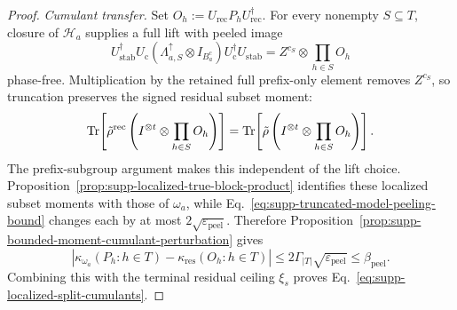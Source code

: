 \documentclass[
  aps,
  prx,
  reprint,
  superscriptaddress,
  amsmath,
  amssymb,
  nofootinbib,
  longbibliography
]{revtex4-2}
\begin{document}
\begin{proof}
\emph{Cumulant transfer.}
Set $O_h:=U_{\mathrm{rec}}P_hU_{\mathrm{rec}}^\dagger$.  For every
nonempty $S\subseteq T$, closure of $\mathcal H_a$ supplies a full lift
with peeled image
\begin{equation}
U_{\mathrm{stab}}^\dagger
U_{\mathrm c}
\left(\Lambda_{a,S}^\uparrow\otimes I_{B_a^c}\right)
U_{\mathrm c}^\dagger
U_{\mathrm{stab}}
=
Z^{c_S}\otimes\prod_{h\in S}O_h
\end{equation}
phase-free.  Multiplication by the retained full prefix-only element removes
$Z^{c_S}$, so truncation preserves the signed residual subset moment:
\begin{equation}
\Tr\!\left[
\tilde\rho^{\mathrm{rec}}
\left(I^{\otimes t}\otimes\prod_{h\in S}O_h\right)
\right]
=
\Tr\!\left[
\tilde\rho
\left(I^{\otimes t}\otimes\prod_{h\in S}O_h\right)
\right].
\label{eq:supp-tested-moment-truncation-preservation}
\end{equation}
The prefix-subgroup argument makes this independent of the lift choice.
Proposition~\ref{prop:supp-localized-true-block-product} identifies these
localized subset moments with those of $\omega_a$, while
Eq.~\eqref{eq:supp-truncated-model-peeling-bound} changes each by at most
$2\sqrt{\varepsilon_{\mathrm{peel}}}$.  Therefore
Proposition~\ref{prop:supp-bounded-moment-cumulant-perturbation} gives
\begin{equation}
\left|
\kappa_{\omega_a}(P_h:h\in T)
-
\kappa_{\mathrm{res}}(O_h:h\in T)
\right|
\le
2\Gamma_{|T|}\sqrt{\varepsilon_{\mathrm{peel}}}
\le
\beta_{\mathrm{peel}}.
\end{equation}
Combining this with the terminal residual ceiling $\xi_s$ proves
Eq.~\eqref{eq:supp-localized-split-cumulants}.


\end{proof}
\end{document}
